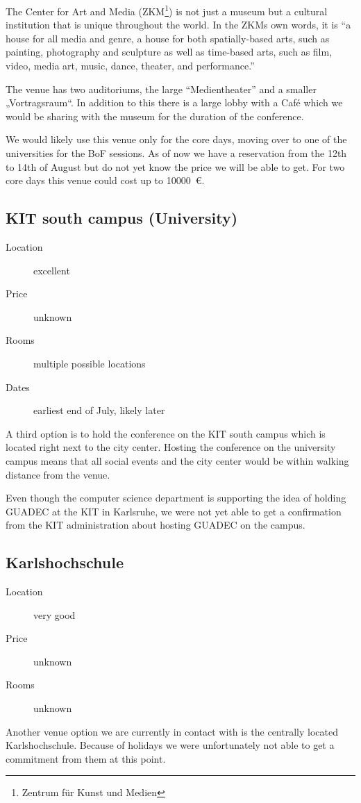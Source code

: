 The Center for Art and Media (ZKM\footnote{Zentrum für Kunst und Medien}) is not
just a museum but a cultural institution that is unique throughout the world.
In the ZKMs own words, it is “a house for all media and genre, a house for both
spatially-based arts, such as painting, photography and sculpture as well as
time-based arts, such as film, video, media art, music, dance, theater, and performance.”

The venue has two auditoriums, the large “Medientheater” and a smaller
„Vortragsraum“. In addition to this there is a large lobby with a Café which we
would be sharing with the museum for the duration of the conference.

We would likely use this venue only for the core days, moving over to one of the
universities for the BoF sessions. As of now we have a reservation from the
12th to 14th of August but do not yet know the price we will be able to get.
For two core days this venue could cost up to \SI{10000}{\euro}.


\subsection{KIT south campus (University)}
\begin{description}
\item[Location] excellent
\item[Price] unknown
\item[Rooms] multiple possible locations
\item[Dates] earliest end of July, likely later
\end{description}

A third option is to hold the conference on the KIT south campus which is
located right next to the city center. Hosting the conference on the university
campus means that all social events and the city center would be within walking
distance from the venue.

Even though the computer science department is supporting the idea of holding
GUADEC at the KIT in Karlsruhe, we were not yet able to get a confirmation from
the KIT administration about hosting GUADEC on the campus.

\subsection{Karlshochschule}
\begin{description}
\item[Location] very good
\item[Price] unknown
\item[Rooms] unknown
\end{description}

Another venue option we are currently in contact with is the centrally
located Karlshochschule. Because of holidays we were unfortunately not able
to get a commitment from them at this point.

